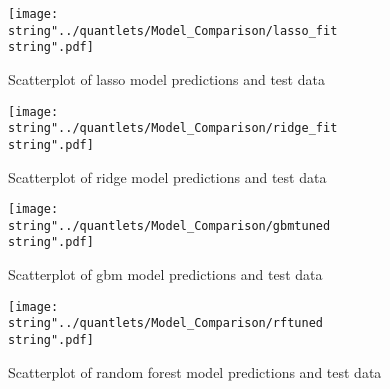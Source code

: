 \begin{figure}[H]
\centering
	\texttt{[image: \\string"../quantlets/Model\_Comparison/lasso\_fit\\string".pdf]}
  	\caption{Scatterplot of lasso model predictions and test data}
  	\label{fig:lasso}
\end{figure}

\begin{figure}[H]
\centering
	\texttt{[image: \\string"../quantlets/Model\_Comparison/ridge\_fit\\string".pdf]}
  	\caption{Scatterplot of ridge model predictions and test data}
  	\label{fig:ridge}
\end{figure}

\begin{figure}[H]
\centering
	\texttt{[image: \\string"../quantlets/Model\_Comparison/gbmtuned\\string".pdf]}
  	\caption{Scatterplot of gbm model predictions and test data}
  	\label{fig:gbm}
\end{figure}

\begin{figure}[H]
\centering
	\texttt{[image: \\string"../quantlets/Model\_Comparison/rftuned\\string".pdf]}
  	\caption{Scatterplot of random forest model predictions and test data}
  	\label{fig:rf}
\end{figure}

